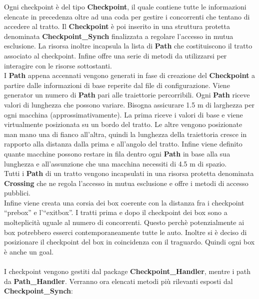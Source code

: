 Ogni checkpoint \`{e} del tipo \textbf{Checkpoint}, il quale contiene tutte le informazioni elencate in precedenza oltre ad una coda per gestire
i concorrenti che tentano di accedere al tratto. Il \textbf{Checkpoint} \`{e} poi inserito in una struttura protetta denominata 
\textbf{Checkpoint\_Synch} finalizzata a regolare l'accesso in mutua esclusione. La risorsa inoltre incapsula la lista di \textbf{Path}
che costituiscono il tratto associato al checkpoint. Infine offre una serie di metodi da utilizzarsi per interagire con le risorse sottostanti.\\
I \textbf{Path} appena accennati vengono generati in fase di creazione del \textbf{Checkpoint} a partire dalle informazioni di base
reperite dal file di configurazione. Viene generator un numero di \textbf{Path} pari alle traiettorie percorribili. Ogni \textbf{Path} 
riceve valori di lunghezza che possono variare. Bisogna assicurare 1.5 m di larghezza per ogni macchina (approssimativamente). La prima
riceve i valori di base e viene virtualmente posizionata su un bordo del tratto. Le altre vengono posizionate man mano una di fianco all'altra,
quindi la lunghezza della traiettoria cresce in rapporto alla distanza dalla prima e all'angolo del tratto. 
Infine viene definito quante macchine possono restare in fila dentro ogni \textbf{Path} in base alla sua lunghezza e all'assunzione
che una macchina necessiti di 4.5 m di spazio.\\Tutti i \textbf{Path} di un tratto
vengono incapsulati in una risorsa protetta denominata \textbf{Crossing} che ne regola l'accesso in mutua esclusione e offre i metodi di 
accesso pubblici.\\
Infine viene creata una corsia dei box coerente con la distanza fra i checkpoint ``prebox'' e l'``exitbox''. I tratti prima e dopo il checkpoint
dei box sono a molteplicit\`{a} uguale al numero di concorrenti. Questo perch\`{e} potenzialmente ai box potrebbero esserci contemporaneamente tutte
le auto. Inoltre si \`{e} deciso di posizionare il checkpoint del box in coincidenza con il traguardo. Quindi ogni box \`{e} anche un goal.\\\\
I checkpoint vengono gestiti dal package \textbf{Checkpoint\_Handler}, mentre i path da \textbf{Path\_Handler}.
Verranno ora elencati metodi pi\`{u} rilevanti esposti dal \textbf{Checkpoint\_Synch}:
